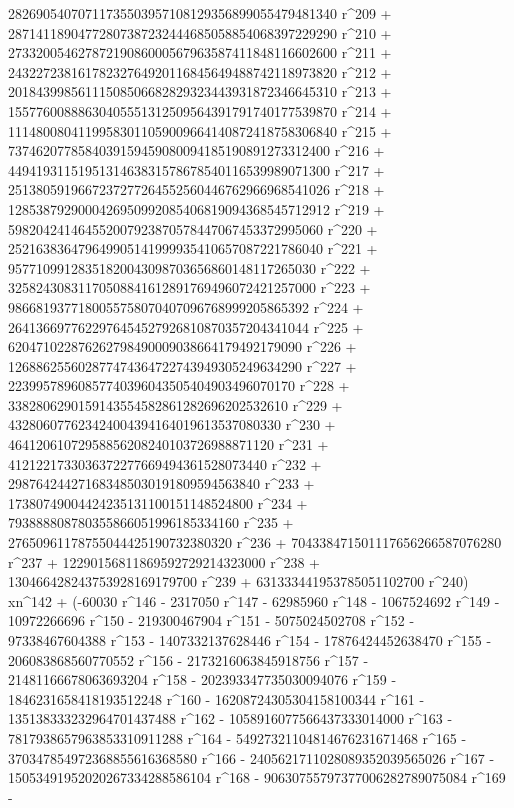        28269054070711735503957108129356899055479481340 r^209 + 
       28714118904772807387232444685058854068397229290 r^210 + 
       27332005462787219086000567963587411848116602600 r^211 + 
       24322723816178232764920116845649488742118973820 r^212 + 
       20184399856111508506682829323443931872346645310 r^213 + 
       15577600888630405551312509564391791740177539870 r^214 + 
       11148008041199583011059009664140872418758306840 r^215 + 
       7374620778584039159459080094185190891273312400 r^216 + 
       4494193115195131463831578678540116539989071300 r^217 + 
       2513805919667237277264552560446762966968541026 r^218 + 
       1285387929000426950992085406819094368545712912 r^219 + 
       598204241464552007923870578447067453372995060 r^220 + 
       252163836479649905141999935410657087221786040 r^221 + 
       95771099128351820043098703656860148117265030 r^222 + 
       32582430831170508841612891769496072421257000 r^223 + 
       9866819377180055758070407096768999205865392 r^224 + 
       2641366977622976454527926810870357204341044 r^225 + 
       620471022876262798490009038664179492179090 r^226 + 
       126886255602877474364722743949305249634290 r^227 + 
       22399578960857740396043505404903496070170 r^228 + 
       3382806290159143554582861282696202532610 r^229 + 
       432806077623424004394164019613537080330 r^230 + 
       46412061072958856208240103726988871120 r^231 + 
       4121221733036372277669494361528073440 r^232 + 
       298764244271683485030191809594563840 r^233 + 
       17380749004424235131100151148524800 r^234 + 
       793888808780355866051996185334160 r^235 + 
       27650961178755044425190732380320 r^236 + 
       704338471501117656266587076280 r^237 + 
       12290156811869592729214323000 r^238 + 
       130466428243753928169179700 r^239 + 
       631333441953785051102700 r^240) xn^142 + (-60030 r^146 - 
       2317050 r^147 - 62985960 r^148 - 1067524692 r^149 - 
       10972266696 r^150 - 219300467904 r^151 - 5075024502708 r^152 - 
       97338467604388 r^153 - 1407332137628446 r^154 - 
       17876424452638470 r^155 - 206083868560770552 r^156 - 
       2173216063845918756 r^157 - 21481166678063693204 r^158 - 
       202393347735030094076 r^159 - 1846231658418193512248 r^160 - 
       16208724305304158100344 r^161 - 
       135138333232964701437488 r^162 - 
       1058916077566437333014000 r^163 - 
       7817938657963853310911288 r^164 - 
       54927321104814676231671468 r^165 - 
       370347854972368855616368580 r^166 - 
       2405621711028089352039565026 r^167 - 
       15053491952020267334288586104 r^168 - 
       90630755797377006282789075084 r^169 - 
